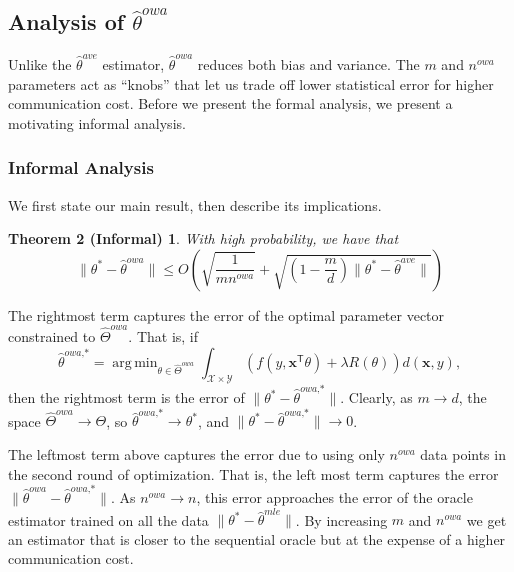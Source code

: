 \documentclass[twoside]{article}
\DeclareMathOperator*{\argmin}{arg\,min}
\newcommand{\nreopt}{n^{\textit{owa}}}
\newcommand{\Y}{\mathcal{Y}}
\newcommand{\X}{\mathcal{X}}
\newcommand{\W}{{\hat \Theta^{\textit{owa}}}}
\newcommand{\x}{\mathbf{x}}
\newcommand{\w}{\theta}
\newcommand{\wowa}{\hat\w^{owa}}
\newcommand{\wowastar}{\hat\w^{\textit{owa,*}}}
\newcommand{\wave}{\hat\w^{ave}}
\newcommand{\wmle}{\hat\w^{mle}}
\newcommand{\wstar}{{\w^{*}}}
\newcommand{\trans}[1]{\ensuremath{{#1}^{\mathsf{T}}}}
\newcommand{\ltwo}[1]{{\lVert {#1} \rVert}}
\begin{document}
\subsection {Analysis of $\wowa$}

Unlike the $\wave$ estimator,
$\wowa$ reduces both bias and variance.
The $m$ and $\nreopt$ parameters act as ``knobs'' that let us trade off lower statistical error for higher communication cost.
Before we present the formal analysis,
we present a motivating informal analysis.

\subsubsection{Informal Analysis}
We first state our main result,
then describe its implications.
\newtheorem*{theoreminf}{Theorem 2 (Informal)}
\begin{theoreminf}
With high probability, we have that
\begin{equation}
\ltwo{\wstar-\wowa}
\le
O\left(
    \sqrt{\frac{1}{m\nreopt}}
    +
    \sqrt{\left(1-\frac{m}{d}\right)\ltwo{\wstar-\wave}}
\right)
\label{eq:informal}
\end{equation}
\label{thm:informal}
\end{theoreminf}
The rightmost term captures the error of the optimal parameter vector constrained to $\W$.
That is, if
\begin{equation}
\wowastar = \argmin_{\w\in\W} \int_{\X\times\Y} \left(f(y,\trans\x\w) + \lambda R(\w)\right) d(\x,y)
,
\end{equation}
then the rightmost term is the error of $\ltwo{\wstar-\wowastar}$.
Clearly, as $m \to d$, the space $\W \to \Theta$, so $\wowastar\to\wstar$, and $\ltwo{\wstar-\wowastar}\to 0$.

The leftmost term above captures the error due to using only $\nreopt$ data points in the second round of optimization.
That is, the left most term captures the error $\ltwo{\wowa-\wowastar}$.
As $\nreopt\to n$, this error approaches the error of the oracle estimator trained on all the data $\ltwo{\wstar-\wmle}$.
By increasing $m$ and $\nreopt$ we get an estimator that is closer to the sequential oracle
but at the expense of a higher communication cost.
\end{document}
